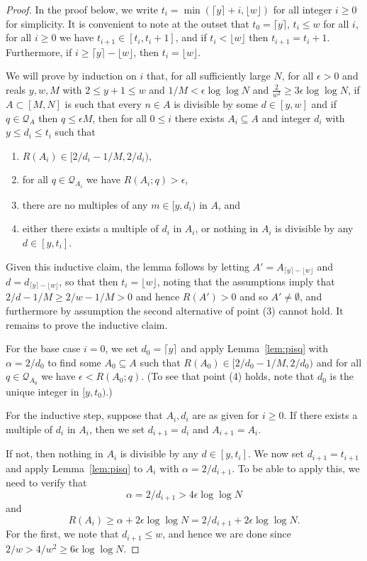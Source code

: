 \begin{proof}
In the proof below, we write $t_i=\min(\lceil y\rceil +i, \lfloor w\rfloor)$ for all integer $i\geq 0$ for simplicity. It is convenient to note at the outset that $t_0=\lceil y\rceil$, $t_i\leq w$ for all $i$, for all $i\geq 0$ we have $t_{i+1}\in [t_i,t_i+1]$, and if $t_i< \lfloor w\rfloor$ then $t_{i+1}=t_i+1$. Furthermore, if $i\geq \lceil y\rceil-\lfloor w\rfloor $, then $t_i=\lfloor w\rfloor$. 

We will prove by induction on $i$ that, for all sufficiently large $N$, for all $\epsilon>0$ and reals $y,w,M$ with $2\leq y+1\leq w$ and $1/M< \epsilon\log\log N$ and $\frac{2}{w^2}\geq 3\epsilon\log\log N$, if $A\subset [M,N]$ is such that every $n\in A$ is divisible by some $d\in[y,w]$ and if $q\in \mathcal{Q}_A$ then $q\leq \epsilon M$, then for all $0\leq i$ there exists $ A_i\subseteq A$ and integer $d_i$ with $y\leq d_i\leq t_i$ such that
\begin{enumerate}
\item $R(A_i) \in [2/d_i-1/M, 2/d_i)$, 
\item for all $q\in \mathcal{Q}_{A_i}$ we have $R(A_i;q)> \epsilon$, 
\item there are no multiples of any $m\in [y,d_i)$ in $A$, and
\item either there exists a multiple of $d_i$ in $A_i$, or nothing in $A_i$ is divisible by any $d\in [y,t_i]$. 
\end{enumerate}

Given this inductive claim, the lemma follows by letting $A' = A_{ \lceil y\rceil-\lfloor w\rfloor }$ and $d=d_{ \lceil y\rceil-\lfloor w\rfloor }$, so that then $t_i=\lfloor w\rfloor$, noting that the assumptions imply that $2/d-1/M\geq 2/w-1/M>0$ and hence $R(A')>0$ and so $A'\neq\emptyset$, and furthermore by assumption the second alternative of point (3) cannot hold. It remains to prove the inductive claim.

For the base case $i=0$, we set $d_0=\lceil y\rceil$ and apply Lemma~\ref{lem:pisq} with $\alpha=2/d_0$ to find some $A_0\subseteq A$ such that $R(A_0)\in[2/d_0-1/M,2/d_0)$ and for all $q\in \mathcal{Q}_{A_0}$ we have $\epsilon < R(A_0;q)$. (To see that point (4) holds, note that $d_0$ is the unique integer in $[y,t_0)$.)

For the inductive step, suppose that $A_i,d_i$ are as given for $i\geq 0$. If there exists a multiple of $d_i$ in $A_i$, then we set $d_{i+1}=d_i$ and $A_{i+1}=A_i$. 

If not, then nothing in $A_i$ is divisible by any $d\in [y,t_i]$. We now set $d_{i+1}=t_{i+1}$ and apply Lemma~\ref{lem:pisq} to $A_i$ with $\alpha=2/d_{i+1}$. To be able to apply this, we need to verify that 
\[\alpha=2/d_{i+1}> 4\epsilon\log\log N\]
and
\[R(A_i)\geq \alpha+2\epsilon\log\log N= 2/d_{i+1}+2\epsilon\log\log N.\]
For the first, we note that $d_{i+1}\leq w$, and hence we are done since $2/w>4/w^2\geq  6\epsilon\log\log N$. 


\end{proof}
